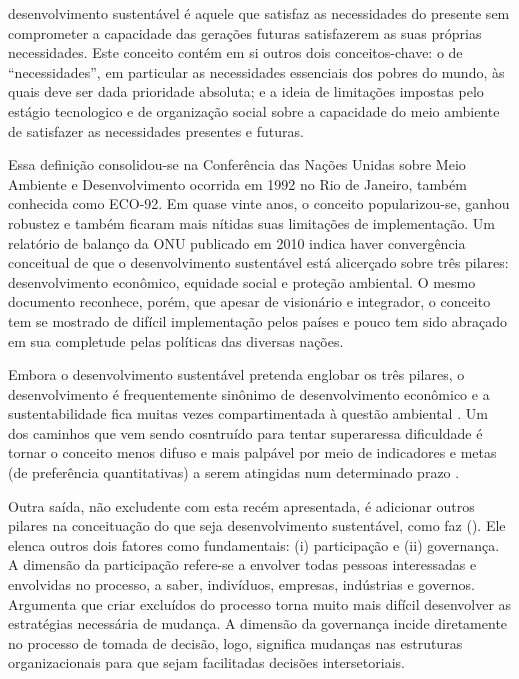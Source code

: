 \begin{citacao}
desenvolvimento sustentável é aquele que satisfaz as necessidades do presente sem comprometer a capacidade das gerações futuras satisfazerem as suas próprias necessidades. Este conceito contém em si outros dois conceitos-chave: o de ``necessidades'', em particular as necessidades essenciais dos pobres do mundo, às quais deve ser dada prioridade absoluta; e a ideia de limitações impostas pelo estágio tecnologico e de organização social sobre a capacidade do meio ambiente de satisfazer as necessidades presentes e futuras. 
\cite[p.41]{WCED1987}
\end{citacao}   

Essa definição consolidou-se na Conferência das Nações Unidas sobre Meio Ambiente e Desenvolvimento ocorrida em 1992 no Rio de Janeiro, também conhecida como ECO-92. Em quase vinte anos, o conceito popularizou-se, ganhou robustez e também ficaram mais nítidas suas limitações de implementação. Um relatório de balanço da ONU publicado em 2010 \cite{ONU2010} indica haver convergência conceitual de que o desenvolvimento sustentável está alicerçado sobre três pilares: desenvolvimento econômico, equidade social e proteção ambiental. O mesmo documento reconhece, porém, que apesar de visionário e integrador, o conceito tem se mostrado de difícil implementação pelos países e pouco tem sido abraçado em sua completude pelas políticas das diversas nações. 

Embora o desenvolvimento sustentável pretenda englobar os três pilares, o desenvolvimento é frequentemente sinônimo de desenvolvimento econômico e a sustentabilidade fica muitas vezes compartimentada à questão ambiental \cite{ONU2010}. Um dos caminhos que vem sendo cosntruído para tentar superaressa dificuldade é tornar o conceito menos difuso e mais palpável por meio de indicadores \cite{CHAMBERS2000,BOULANGER2008,BARRETT2010,FORTES2012} e metas (de preferência quantitativas) a serem atingidas num determinado prazo \cite{ONU2010,ONU2014}.

Outra saída, não excludente com esta recém apresentada, é adicionar outros pilares na conceituação do que seja desenvolvimento sustentável, como faz 
 (\citeyear{BANISTER2005}). Ele elenca outros dois fatores como fundamentais: (i) participação e (ii) governança. A dimensão da participação refere-se a envolver todas pessoas interessadas e envolvidas no processo, a saber, indivíduos, empresas, indústrias e governos. Argumenta que criar excluídos do processo torna muito mais difícil desenvolver as estratégias necessária de mudança. A dimensão da governança incide diretamente no processo de tomada de decisão, logo, significa mudanças nas estruturas organizacionais para que sejam facilitadas decisões intersetoriais.

